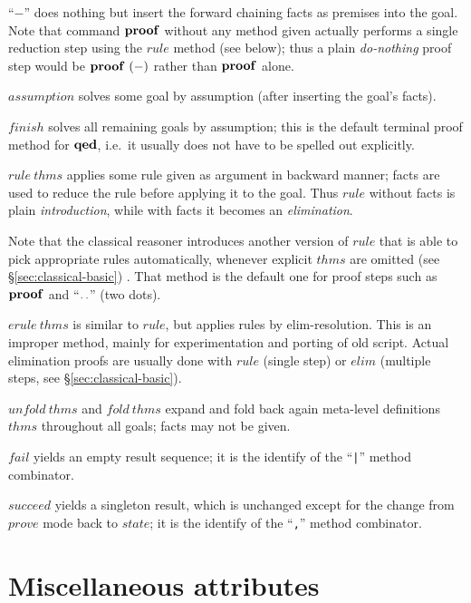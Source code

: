 \begin{descr}
\item [``$-$''] does nothing but insert the forward chaining facts as premises
  into the goal.  Note that command ${\mathord{\mathbf{proof}}}$ without any method given
  actually performs a single reduction step using the $rule$ method (see
  below); thus a plain \emph{do-nothing} proof step would be $\PROOF{-}$
  rather than ${\mathord{\mathbf{proof}}}$ alone.
\item [$assumption$] solves some goal by assumption (after inserting the
  goal's facts).
\item [$finish$] solves all remaining goals by assumption; this is the default
  terminal proof method for ${\mathord{\mathbf{qed}}}$, i.e.\ it usually does not have to be
  spelled out explicitly.
\item [$rule~thms$] applies some rule given as argument in backward manner;
  facts are used to reduce the rule before applying it to the goal.  Thus
  $rule$ without facts is plain \emph{introduction}, while with facts it
  becomes an \emph{elimination}.
  
  Note that the classical reasoner introduces another version of $rule$ that
  is able to pick appropriate rules automatically, whenever explicit $thms$
  are omitted (see \S\ref{sec:classical-basic}) .  That method is the default
  one for proof steps such as ${\mathord{\mathbf{proof}}}$ and ``${\mathord{\mathbf{.\,.}}}$'' (two dots).
  
\item [$erule~thms$] is similar to $rule$, but applies rules by
  elim-resolution.  This is an improper method, mainly for experimentation and
  porting of old script.  Actual elimination proofs are usually done with
  $rule$ (single step) or $elim$ (multiple steps, see
  \S\ref{sec:classical-basic}).
  
\item [$unfold~thms$ and $fold~thms$] expand and fold back again meta-level
  definitions $thms$ throughout all goals; facts may not be given.

\item [$fail$] yields an empty result sequence; it is the identify of the
  ``\texttt{|}'' method combinator.
  
\item [$succeed$] yields a singleton result, which is unchanged except for the
  change from $prove$ mode back to $state$; it is the identify of the
  ``\texttt{,}'' method combinator.
\end{descr}


\section{Miscellaneous attributes}

